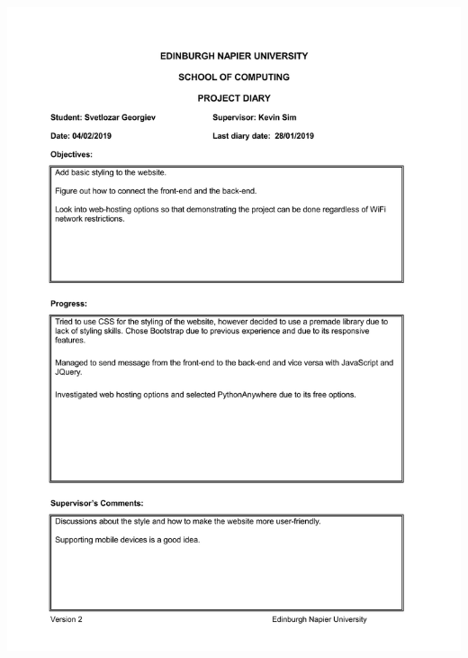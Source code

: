 \documentclass[12pt,a4paper]{article}
\begin{document}
\begin{appendices}
\includegraphics[width=\textwidth,height=\textheight,keepaspectratio]{s2week4.jpg}
\newpage

\end{appendices}
\end{document}
